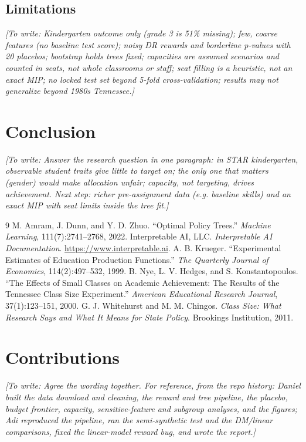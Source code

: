 \documentclass[11pt]{article}
\newcommand{\placeholder}[1]{\par\noindent\textit{[To write: #1]}\par}
\begin{document}
\subsection{Limitations}
\placeholder{Kindergarten outcome only (grade 3 is 51\% missing); few, coarse features
(no baseline test score); noisy DR rewards and borderline p-values with 20 placebos;
bootstrap holds trees fixed; capacities are assumed scenarios and counted in seats, not
whole classrooms or staff; seat filling is a heuristic, not an exact MIP; no locked test
set beyond 5-fold cross-validation; results may not generalize beyond 1980s Tennessee.}

\section{Conclusion}  %
\placeholder{Answer the research question in one paragraph: in STAR kindergarten,
observable student traits give little to target on; the only one that matters (gender)
would make allocation unfair; capacity, not targeting, drives achievement. Next step:
richer pre-assignment data (e.g. baseline skills) and an exact MIP with seat limits inside
the tree fit.}

\begin{thebibliography}{9}
 M. Amram, J. Dunn, and Y. D. Zhuo. ``Optimal Policy Trees.''
\emph{Machine Learning}, 111(7):2741--2768, 2022.
 Interpretable AI, LLC. \emph{Interpretable AI Documentation}.
\url{https://www.interpretable.ai}.
 A. B. Krueger. ``Experimental Estimates of Education Production
Functions.'' \emph{The Quarterly Journal of Economics}, 114(2):497--532, 1999.
 B. Nye, L. V. Hedges, and S. Konstantopoulos. ``The Effects of Small
Classes on Academic Achievement: The Results of the Tennessee Class Size Experiment.''
\emph{American Educational Research Journal}, 37(1):123--151, 2000.
 G. J. Whitehurst and M. M. Chingos. \emph{Class Size: What
Research Says and What It Means for State Policy}. Brookings Institution, 2011.
\end{thebibliography}

\section*{Contributions}
\placeholder{Agree the wording together. For reference, from the repo history: Daniel
built the data download and cleaning, the reward and tree pipeline, the placebo, budget
frontier, capacity, sensitive-feature and subgroup analyses, and the figures; Adi
reproduced the pipeline, ran the semi-synthetic test and the DM/linear comparisons, fixed
the linear-model reward bug, and wrote the report.}
\end{document}
